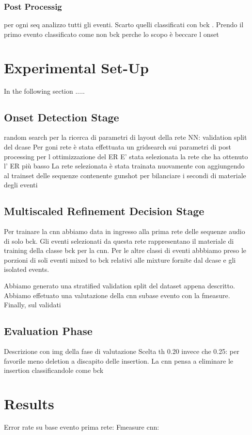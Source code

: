 \documentclass{article}
\begin{document}
\begin{sloppy}
\subsubsection{Post Processig }
per ogni seq analizzo tutti gli eventi. Scarto quelli classificati con bck . Prendo il primo evento classificato come non bck perche lo scopo è beccare l onset

\section{Experimental Set-Up}
\label{sec:pagestyle}
In the following section .....
\subsection{Onset Detection Stage}
random search per la ricerca di parametri di layout della rete NN: validation split del dcase 
Per goni rete è stata effettuata un gridsearch sui parametri di post processing per l ottimizzazione del ER
E' stata selezionata la rete che ha ottenuto l' ER più basso
La rete selezionata è stata trainata nuovamente con aggiungendo al trainset delle sequenze  contenente gunshot per bilanciare i secondi di materiale degli eventi

\subsection{Multiscaled Refinement Decision Stage}
Per trainare la cnn abbiamo data in ingresso alla prima rete delle sequenze audio di solo bck. Gli eventi selezionati da questa rete rappresentano il materiale di training
della classe bck per la cnn. Per le altre classi di eventi abbbiamo preso le porzioni di soli eventi mixed to bck relativi alle mixture fornite dal dcase e gli isolated events.

Abbiamo generato una stratified validation split del dataset appena descritto. 
Abbiamo effetuato una valutazione della cnn subase evento con la fmeasure.
Finally, sul validati

\subsection{Evaluation Phase}
Descrizione con img della fase di valutazione
Scelta th 0.20 invece che 0.25: per favorile meno deletion a discapito delle insertion. La cnn pensa a eliminare le insertion classificandole come bck
\section{Results}
Error rate su base evento prima rete: 
Fmeasure cnn:


\end{sloppy}
\end{document}
